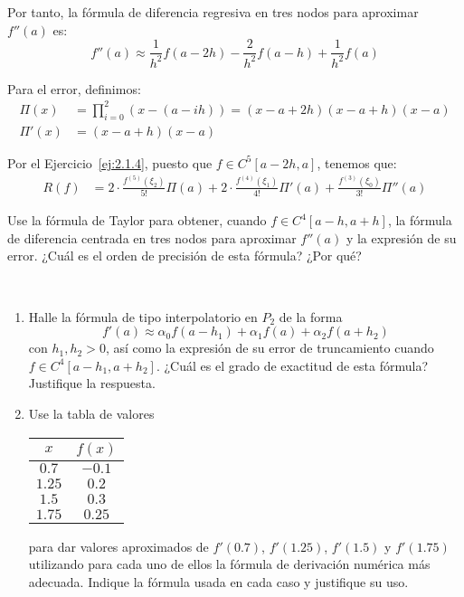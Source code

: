 \begin{ejercicio}
    Por tanto, la fórmula de diferencia regresiva en tres nodos para aproximar $f''(a)$ es:
    \[
    f''(a) \approx \frac{1}{h^2}f(a - 2h) - \frac{2}{h^2}f(a - h) + \frac{1}{h^2}f(a)
    \]

    Para el error, definimos:
    \begin{align*}
        \Pi(x) &= \prod_{i=0}^{2}(x - (a - ih)) = (x - a + 2h)(x - a + h)(x - a)\\
        \Pi'(x) &= (x-a+h)(x-a)
    \end{align*}

    Por el Ejercicio~\ref{ej:2.1.4}, puesto que $f \in C^5[a - 2h, a]$, tenemos que:
    \begin{align*}
        R(f) &= 2\cdot \frac{f^{(5)}(\xi_2)}{5!}\Pi(a) + 2\cdot \frac{f^{(4)}(\xi_1)}{4!}\Pi'(a) + \frac{f^{(3)}(\xi_0)}{3!}\Pi''(a)
    \end{align*}
\end{ejercicio}

\begin{ejercicio}\label{ej:2.1.6}
    Use la fórmula de Taylor para obtener, cuando $f \in C^4[a - h, a + h]$, la fórmula de diferencia centrada en tres nodos para aproximar $f''(a)$ y la expresión de su error. ¿Cuál es el orden de precisión de esta fórmula? ¿Por qué?
\end{ejercicio}

\begin{ejercicio}\label{ej:2.1.7}~
    \begin{enumerate}
        \item Halle la fórmula de tipo interpolatorio en $P_2$ de la forma
        \[
        f'(a) \approx \alpha_0 f(a - h_1) + \alpha_1 f(a) + \alpha_2 f(a + h_2)
        \]
        con $h_1, h_2 > 0$, así como la expresión de su error de truncamiento cuando $f \in C^4[a - h_1, a + h_2]$. ¿Cuál es el grado de exactitud de esta fórmula? Justifique la respuesta.
        
        \item Use la tabla de valores
        \begin{center}
            \begin{tabular}{c|c}
                $x$ & $f(x)$ \\
                \hline
                $0.7$ & $-0.1$ \\
                $1.25$ & $0.2$ \\
                $1.5$ & $0.3$ \\
                $1.75$ & $0.25$
            \end{tabular}
        \end{center}
        para dar valores aproximados de $f'(0.7)$, $f'(1.25)$, $f'(1.5)$ y $f'(1.75)$ utilizando para cada uno de ellos la fórmula de derivación numérica más adecuada. Indique la fórmula usada en cada caso y justifique su uso.
    \end{enumerate}
\end{ejercicio}

